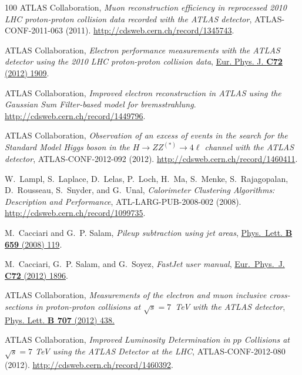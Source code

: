 \documentclass[final,3p,times,twocolumn]{elsarticle}
\begin{document}
\begin{thebibliography}{100}
{ATLAS Collaboration}, {\em {Muon reconstruction efficiency in reprocessed 2010
  LHC proton-proton collision data recorded with the ATLAS detector}},
  {ATLAS-CONF-2011-063} (2011). \url{http://cdsweb.cern.ch/record/1345743}.

{ATLAS Collaboration}, {\em {Electron performance measurements with the ATLAS
  detector using the 2010 LHC proton-proton collision data}}, 
\href{http://dx.doi.org/10.1140/epjc/s10052-012-1909-1}{Eur. Phys. J. 
{\bfseries C72} (2012) 1909}.

{ATLAS} Collaboration, {\em Improved electron reconstruction in ATLAS using the
  Gaussian Sum Filter-based model for bremsstrahlung}.
  \url{http://cdsweb.cern.ch/record/1449796}.

{{ATLAS}} Collaboration, {\em Observation of an excess of events in the search
  for the Standard Model Higgs boson in the $H\rightarrow ZZ^{(*)}\rightarrow
  4\ell$ channel with the ATLAS detector}, ATLAS-CONF-2012-092 (2012).
  \url{http://cdsweb.cern.ch/record/1460411}.

W.~Lampl, S.~Laplace, D.~Lelas, P.~Loch, H.~Ma, S.~Menke, S.~Rajagopalan,
  D.~Rousseau, S.~Snyder, and G.~Unal, {\em Calorimeter Clustering Algorithms:
  Description and Performance}, {ATL-LARG-PUB-2008-002} (2008).
  \url{http://cdsweb.cern.ch/record/1099735}.

M.~Cacciari and G.~P. Salam, {\em {Pileup subtraction using jet areas}},
  \href{http://dx.doi.org/10.1016/j.physletb.2007.09.077}{Phys.~Lett.
  {\bfseries B 659} (2008) 119}.

M.~Cacciari, G.~P. Salam, and G.~Soyez, {\em {FastJet user manual}},
  \href{http://dx.doi.org/10.1140/epjc/s10052-012-1896-2}{Eur.~Phys.~J.
  {\bfseries C72} (2012) 1896}.

{ATLAS Collaboration}, {\em {Measurements of the electron and muon inclusive
  cross-sections in proton-proton collisions at $\sqrt{s} = 7$~TeV with the
  ATLAS detector}}, \href{http://dx.doi.org/10.1016/j.physletb.2011.12.054}
{Phys. Lett. {\bfseries B 707} (2012) 438.}

{ATLAS Collaboration}, {\em Improved Luminosity Determination in $pp$
  Collisions at $\sqrt{s} = 7$ TeV using the ATLAS Detector at the LHC},
  {ATLAS-CONF-2012-080} (2012). \url{http://cdsweb.cern.ch/record/1460392}.


\end{thebibliography}
\end{document}
